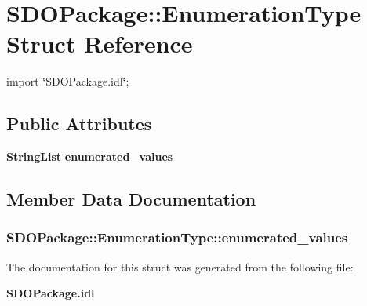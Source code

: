 \section{SDOPackage::EnumerationType Struct Reference}
\label{structSDOPackage_1_1EnumerationType}


{\ttfamily import \char`\"{}SDOPackage.idl\char`\"{};}

\subsection*{Public Attributes}
\begin{DoxyCompactItemize}
\item 
{\bf StringList} {\bf enumerated\_\-values}
\end{DoxyCompactItemize}


\subsection{Member Data Documentation}
\subsubsection[{enumerated\_\-values}]{ {\bf SDOPackage::EnumerationType::enumerated\_\-values}}\label{structSDOPackage_1_1EnumerationType_a9b6c16891322e19809a402b850cb9243}


The documentation for this struct was generated from the following file:\begin{DoxyCompactItemize}
\item 
{\bf SDOPackage.idl}\end{DoxyCompactItemize}
